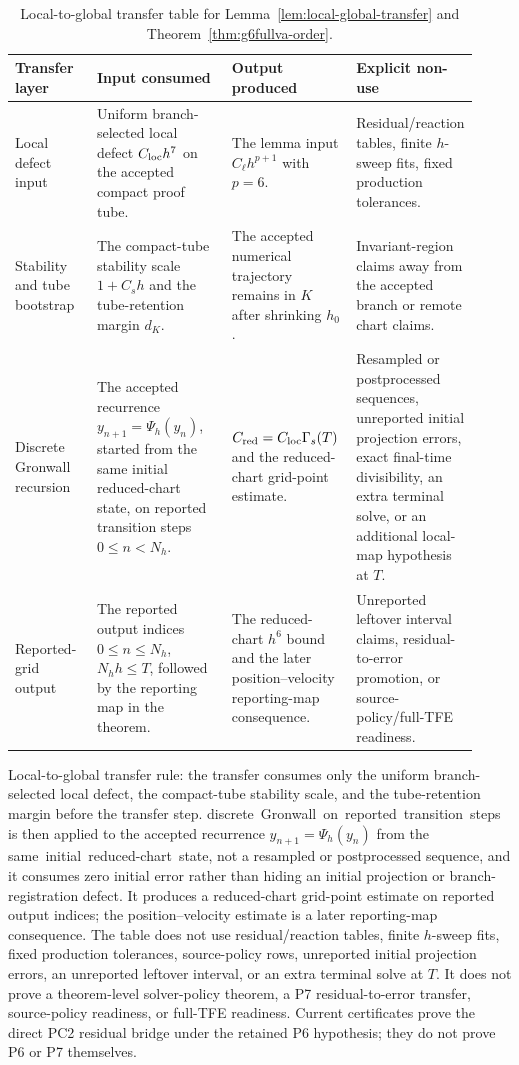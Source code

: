 \documentclass[preprint,12pt]{elsarticle}
\newcommand{\tfe}{TFE}
\begin{document}
\begin{table}[htbp]
\centering
\caption{Local-to-global transfer table for
Lemma~\ref{lem:local-global-transfer} and
Theorem~\ref{thm:g6fullva-order}.}
\label{tab:local-global-transfer-ledger}
\scriptsize
\setlength{\tabcolsep}{2pt}
\renewcommand{\arraystretch}{0.9}
\begin{tabular}{P{0.18\linewidth}P{0.30\linewidth}P{0.27\linewidth}P{0.17\linewidth}}
\toprule
Transfer layer & Input consumed & Output produced & Explicit non-use \\
\midrule
Local defect input &
Uniform branch-selected local defect \(C_{\rm loc}h^7\) on the accepted
compact proof tube. &
The lemma input \(C_\ell h^{p+1}\) with \(p=6\). &
Residual/reaction tables, finite \(h\)-sweep fits, fixed production
tolerances. \\
Stability and tube bootstrap &
The compact-tube stability scale \(1+C_s h\) and the tube-retention margin
\(d_K\). &
The accepted numerical trajectory remains in \(K\) after shrinking \(h_0\). &
Invariant-region claims away from the accepted branch or remote chart
claims. \\
Discrete Gronwall recursion &
The accepted recurrence \(y_{n+1}=\Psi_h(y_n)\), started from the same
initial reduced-chart state, on reported transition steps \(0\le n<N_h\). &
\(C_{\rm red}=C_{\rm loc}\Gamma_s(T)\) and the reduced-chart grid-point
estimate. &
Resampled or postprocessed sequences, unreported initial projection errors,
exact final-time divisibility, an extra terminal solve, or an additional
local-map hypothesis at \(T\). \\
Reported-grid output &
The reported output indices \(0\le n\le N_h\), \(N_hh\le T\), followed by
the reporting map in the theorem. &
The reduced-chart \(h^6\) bound and the later position--velocity reporting-map
consequence. &
Unreported leftover interval claims, residual-to-error promotion, or
source-policy/full-\tfe{} readiness. \\
\bottomrule
\end{tabular}
\end{table}

Local-to-global transfer rule: the transfer consumes
only the uniform branch-selected local defect, the compact-tube stability
scale, and the tube-retention margin before the transfer step.
\mbox{discrete Gronwall on reported transition steps} is then applied to the accepted recurrence
\(y_{n+1}=\Psi_h(y_n)\) from the \mbox{same initial reduced-chart state}, not a
resampled or postprocessed sequence, and it consumes zero initial error rather
than hiding an initial projection or branch-registration defect. It produces a
reduced-chart grid-point estimate on reported output indices; the
position--velocity estimate is a later reporting-map consequence. The table
does not use residual/reaction tables, finite \(h\)-sweep fits, fixed
production tolerances, source-policy rows, unreported initial projection
errors, an unreported leftover interval, or an extra terminal solve at \(T\).
It does not prove a theorem-level solver-policy theorem, a P7 residual-to-error
transfer, source-policy readiness, or full-\tfe{} readiness. Current
certificates prove the direct PC2 residual bridge under the retained P6
hypothesis; they do not prove P6 or P7 themselves.
\end{document}
